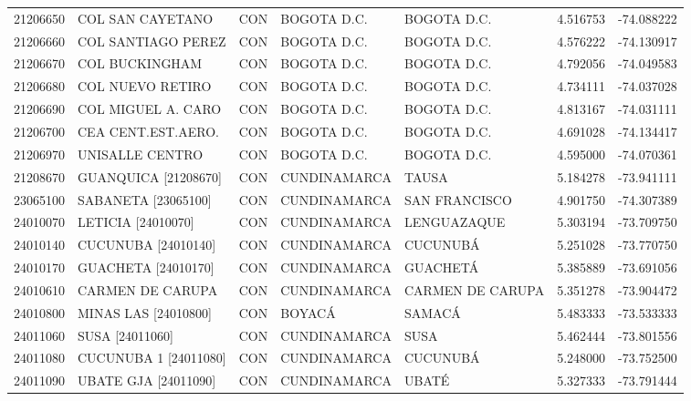 \begin{longtable}{rllllrr}
 21206650 &            COL SAN CAYETANO &  CON &      BOGOTA D.C. &       BOGOTA D.C. &  4.516753 & -74.088222 \\
 21206660 &          COL SANTIAGO PEREZ &  CON &      BOGOTA D.C. &       BOGOTA D.C. &  4.576222 & -74.130917 \\
 21206670 &              COL BUCKINGHAM &  CON &      BOGOTA D.C. &       BOGOTA D.C. &  4.792056 & -74.049583 \\
 21206680 &            COL NUEVO RETIRO &  CON &      BOGOTA D.C. &       BOGOTA D.C. &  4.734111 & -74.037028 \\
 21206690 &          COL MIGUEL A. CARO &  CON &      BOGOTA D.C. &       BOGOTA D.C. &  4.813167 & -74.031111 \\
 21206700 &          CEA CENT.EST.AERO. &  CON &      BOGOTA D.C. &       BOGOTA D.C. &  4.691028 & -74.134417 \\
 21206970 &             UNISALLE CENTRO &  CON &      BOGOTA D.C. &       BOGOTA D.C. &  4.595000 & -74.070361 \\
 21208670 &        GUANQUICA [21208670] &  CON &     CUNDINAMARCA &             TAUSA &  5.184278 & -73.941111 \\
 23065100 &         SABANETA [23065100] &  CON &     CUNDINAMARCA &     SAN FRANCISCO &  4.901750 & -74.307389 \\
 24010070 &          LETICIA [24010070] &  CON &     CUNDINAMARCA &       LENGUAZAQUE &  5.303194 & -73.709750 \\
 24010140 &         CUCUNUBA [24010140] &  CON &     CUNDINAMARCA &          CUCUNUBÁ &  5.251028 & -73.770750 \\
 24010170 &         GUACHETA [24010170] &  CON &     CUNDINAMARCA &          GUACHETÁ &  5.385889 & -73.691056 \\
 24010610 &            CARMEN DE CARUPA &  CON &     CUNDINAMARCA &  CARMEN DE CARUPA &  5.351278 & -73.904472 \\
 24010800 &        MINAS LAS [24010800] &  CON &           BOYACÁ &            SAMACÁ &  5.483333 & -73.533333 \\
 24011060 &             SUSA [24011060] &  CON &     CUNDINAMARCA &              SUSA &  5.462444 & -73.801556 \\
 24011080 &       CUCUNUBA 1 [24011080] &  CON &     CUNDINAMARCA &          CUCUNUBÁ &  5.248000 & -73.752500 \\
 24011090 &        UBATE GJA [24011090] &  CON &     CUNDINAMARCA &             UBATÉ &  5.327333 & -73.791444 \\

\end{longtable}
